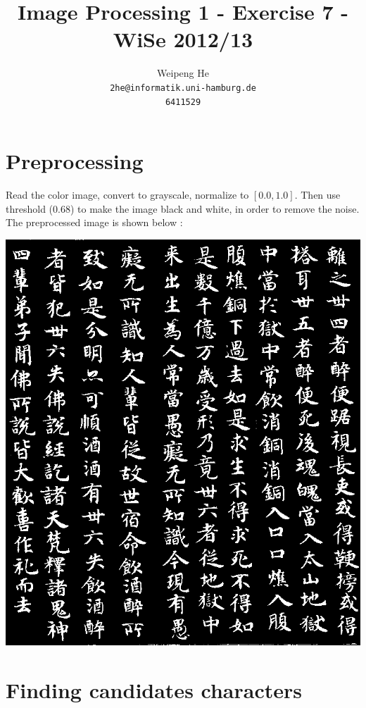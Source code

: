 \documentclass[a4paper,11pt]{article}
\title{Image Processing 1 - Exercise 7 - WiSe 2012/13}
\author{Weipeng He \\ \texttt{2he@informatik.uni-hamburg.de} \\ \texttt{6411529}}
\begin{document}
\maketitle

\section{Preprocessing}

Read the color image, convert to grayscale, normalize to $[0.0, 1.0]$. Then use threshold ($0.68$) to make the image black and white, in order to remove the noise. The preprocessed image is shown below :
\begin{center}
\includegraphics[width=.8\textwidth]{preproc}
\end{center}

\section{Finding candidates characters}
\end{document}
